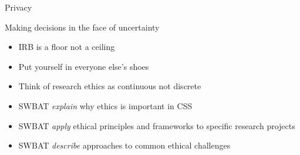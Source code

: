 \documentclass{beamer}
\newcommand{\goals}{
\begin{itemize}
\item SWBAT \emph{explain} why ethics is important in CSS
\item SWBAT \emph{apply} ethical principles and frameworks to specific research projects
\item SWBAT \emph{describe} approaches to common ethical challenges
\end{itemize}
}
\begin{document}
\begin{frame}

\begin{center}
\end{center}

\end{frame}
\begin{frame}

Privacy

\end{frame}
\begin{frame}

Making decisions in the face of uncertainty

\end{frame}
\begin{frame}

\begin{itemize}
\item IRB is a floor not a ceiling
\pause
\item Put yourself in everyone else's shoes
\pause
\item Think of research ethics as continuous not discrete
\end{itemize}

\end{frame}
\begin{frame}

\goals

\end{frame}


\end{document}

